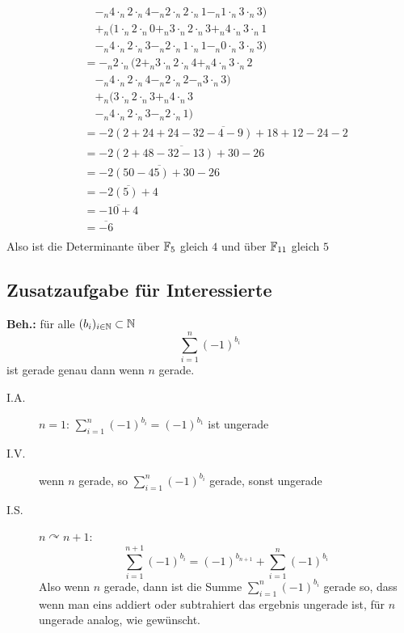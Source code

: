 \documentclass[sectionformat = aufgabe]{gadsescript}
\begin{document}
\begin{enumerate}[label=(\alph*)]
\begin{align*}
			~ &\quad -_n 4 \cdot _n 2 \cdot _n 4 -_n 2 \cdot _n 2 \cdot _n 1 -_n 1 \cdot _n 3 \cdot _n 3) \\
			~ &\quad+_n ( 1 \cdot _n 2 \cdot _n 0 +_n 3 \cdot _n 2 \cdot _n 3 +_n 4 \cdot _n 3 \cdot _n 1 \\
			~ &\quad-_n 4 \cdot _n 2 \cdot _n 3 -_n 2 \cdot _n 1 \cdot _n 1 -_n 0 \cdot _n 3 \cdot _n 3 ) \\
			~ &= -_n 2 \cdot _n ( 2 +_n 3 \cdot _n 2 \cdot _n 4 +_n 4 \cdot _n 3 \cdot _n 2 \\
			~ &\quad -_n 4 \cdot _n 2 \cdot _n 4 -_n 2 \cdot _n 2 -_n 3 \cdot _n 3) \\
			~ &\quad+_n ( 3 \cdot _n 2 \cdot _n 3 +_n 4 \cdot _n 3 \\
			~ &\quad-_n 4 \cdot _n 2 \cdot _n 3 -_n 2 \cdot _n 1 ) \\
			~ &= \overline{ - 2 \left( 2 + 24 + 24 - 32 - 4 - 9 \right) + 18 + 12 - 24 - 2} \\
			~ &= \overline{ - 2 \left( 2 + 48 - 32 - 13 \right) + 30 - 26} \\
			~ &= \overline{ - 2 \left( 50 - 45\right) + 30 - 26} \\
			~ &= \overline{ - 2 \left( 5 \right) + 4} \\
			~ &= \overline{ -10 + 4	} \\
			~ &= \overline{ -6 } \\
		\end{align*}
		Also ist die Determinante über $ \mathbb{F}_5 $ gleich $ 4 $ und über $ \mathbb{F}_{11} $ gleich $ 5 $
\end{enumerate}

\subsection*{Zusatzaufgabe für Interessierte}
\textbf{Beh.:} 
für alle $ (b_i)_{i \in \mathbb{N} } \subset \mathbb{N}  $
\[
	\sum_{i=1}^{n} (-1)^{b_i} 
\]
ist gerade genau dann wenn $ n $ gerade.
\begin{description}
	\item[I.A.] $ n = 1 $: $ \sum_{i=1}^{n} (-1)^{b_i} = (-1)^{b_1}  $ ist ungerade
	\item[I.V.] wenn $ n $ gerade, so $ \sum_{i=1}^{n} (-1)^{b_i}  $ gerade, sonst ungerade
	\item[I.S.] $ n \curvearrowright n + 1 $:
		\[
			\sum_{i=1}^{n + 1} (-1)^{b_i} = (-1)^{b_{n + 1} } + \sum_{i=1}^{n} (-1)^{b_i} 
		\]
		Also wenn $ n $ gerade, dann ist die Summe $ \sum_{i=1}^{n} (-1)^{b_i}  $ gerade so, dass wenn man eins addiert oder subtrahiert das ergebnis ungerade ist,
		für $ n $ ungerade analog, wie gewünscht.
\end{description}
\end{document}
